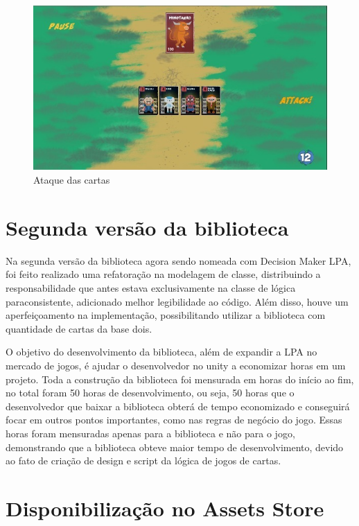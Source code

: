 \begin{figure}[htb]
	\caption{
		\label{fig:fase_2} 
		Ataque das cartas
	}
	\begin{center}
		\includegraphics[scale=0.5]{imagens/fase_2.jpeg}
	\end{center}
\end{figure}


\section{Segunda versão da biblioteca}

Na segunda versão da biblioteca agora sendo nomeada com Decision Maker LPA, foi feito realizado uma refatoração na modelagem de classe, distribuindo a responsabilidade que antes estava exclusivamente na classe de lógica paraconsistente, adicionado melhor legibilidade ao código. Além disso, houve um aperfeiçoamento na implementação, possibilitando utilizar a biblioteca com quantidade de cartas da base dois.

O objetivo do desenvolvimento da biblioteca, além de expandir a LPA no mercado de jogos, é ajudar o desenvolvedor no unity a economizar horas em um projeto. Toda a construção da biblioteca foi mensurada em horas do início ao fim, no total foram 50 horas de desenvolvimento, ou seja, 50 horas que o desenvolvedor que baixar a biblioteca obterá de tempo economizado e conseguirá focar em outros pontos importantes, como nas regras de negócio do jogo. Essas horas foram mensuradas apenas para a biblioteca e não para o jogo, demonstrando que a biblioteca obteve maior tempo de desenvolvimento, devido ao fato de criação de design e script da lógica de jogos de cartas. 

\section{Disponibilização no Assets Store}

